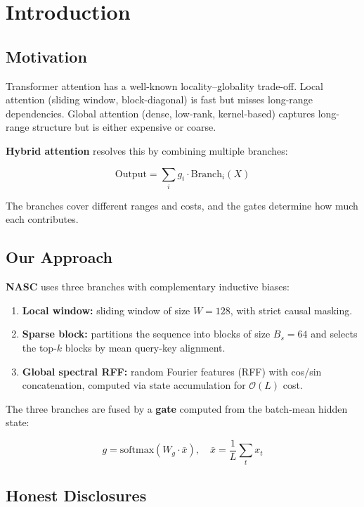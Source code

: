 
\section{Introduction}

\subsection{Motivation}

Transformer attention has a well-known locality--globality trade-off. 
Local attention (sliding window, block-diagonal) is fast but misses 
long-range dependencies. Global attention (dense, low-rank, kernel-based) 
captures long-range structure but is either expensive or coarse.

\textbf{Hybrid attention} resolves this by combining multiple branches:

\[
\text{Output} = \sum_{i} g_i \cdot \text{Branch}_i(X)
\tag{1.1}
\]

The branches cover different ranges and costs, and the gates determine 
how much each contributes.

\subsection{Our Approach}

\textbf{NASC} uses three branches with complementary inductive biases:

\begin{enumerate}
\item \textbf{Local window:} sliding window of size $W = 128$, with
  strict causal masking.
\item \textbf{Sparse block:} partitions the sequence into blocks of size
  $B_s = 64$ and selects the top-$k$ blocks by mean
  query-key alignment.
\item \textbf{Global spectral RFF:} random Fourier features (RFF) with cos/sin
  concatenation, computed via state accumulation for $\mathcal{O}(L)$
  cost.

\end{enumerate}
The three branches are fused by a \textbf{gate} computed from the batch-mean 
hidden state:

\[
g = \text{softmax}(W_g \cdot \bar{x}), \quad \bar{x} = \frac{1}{L} \sum_t x_t
\tag{1.2}
\]

\subsection{Honest Disclosures}


